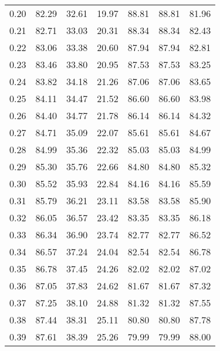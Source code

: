 \begin{tabular}{|c|c|c|c|c|c|c|}
      0.20 &     82.29 &     32.61 &      19.97 &   88.81 &      88.81 &         81.96 \\
      0.21 &     82.71 &     33.03 &      20.31 &   88.34 &      88.34 &         82.43 \\
      0.22 &     83.06 &     33.38 &      20.60 &   87.94 &      87.94 &         82.81 \\
      0.23 &     83.46 &     33.80 &      20.95 &   87.53 &      87.53 &         83.25 \\
      0.24 &     83.82 &     34.18 &      21.26 &   87.06 &      87.06 &         83.65 \\
      0.25 &     84.11 &     34.47 &      21.52 &   86.60 &      86.60 &         83.98 \\
      0.26 &     84.40 &     34.77 &      21.78 &   86.14 &      86.14 &         84.32 \\
      0.27 &     84.71 &     35.09 &      22.07 &   85.61 &      85.61 &         84.67 \\
      0.28 &     84.99 &     35.36 &      22.32 &   85.03 &      85.03 &         84.99 \\
      0.29 &     85.30 &     35.76 &      22.66 &   84.80 &      84.80 &         85.32 \\
      0.30 &     85.52 &     35.93 &      22.84 &   84.16 &      84.16 &         85.59 \\
      0.31 &     85.79 &     36.21 &      23.11 &   83.58 &      83.58 &         85.90 \\
      0.32 &     86.05 &     36.57 &      23.42 &   83.35 &      83.35 &         86.18 \\
      0.33 &     86.34 &     36.90 &      23.74 &   82.77 &      82.77 &         86.52 \\
      0.34 &     86.57 &     37.24 &      24.04 &   82.54 &      82.54 &         86.78 \\
      0.35 &     86.78 &     37.45 &      24.26 &   82.02 &      82.02 &         87.02 \\
      0.36 &     87.05 &     37.83 &      24.62 &   81.67 &      81.67 &         87.32 \\
      0.37 &     87.25 &     38.10 &      24.88 &   81.32 &      81.32 &         87.55 \\
      0.38 &     87.44 &     38.31 &      25.11 &   80.80 &      80.80 &         87.78 \\
      0.39 &     87.61 &     38.39 &      25.26 &   79.99 &      79.99 &         88.00 \\

\end{tabular}
